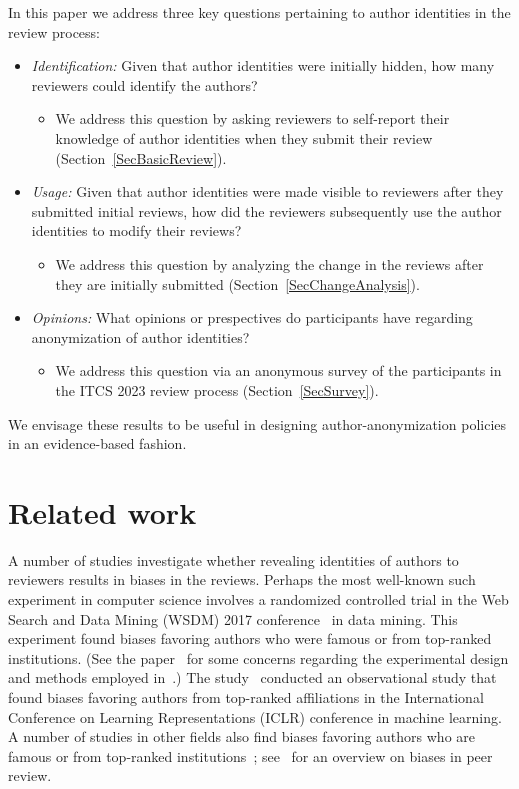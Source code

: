 \documentclass{article}
\newcommand{\rev}[1]{{\color{black}#1}}
\begin{document}
In this paper we address three key questions pertaining to author identities in the review process:
\begin{itemize}
\item \emph{Identification:} Given that author identities were initially hidden, how many reviewers could identify the authors?
\begin{itemize}
    \item We address this question by asking reviewers to self-report their knowledge of author identities when they submit their review (Section~\ref{SecBasicReview}). 
\end{itemize}
%
\item \emph{Usage:} Given that author identities were made visible to reviewers after they submitted initial reviews, how did the reviewers subsequently use the author identities to modify their reviews?
\begin{itemize}
    \item We address this question by analyzing the change in the reviews after they are initially submitted (Section~\ref{SecChangeAnalysis}). 
\end{itemize}
%
\item \emph{Opinions:} What opinions or prespectives do participants have regarding anonymization of author identities? 
\begin{itemize}
    \item We address this question via an anonymous survey of the participants in the ITCS 2023 review process (Section~\ref{SecSurvey}). 
\end{itemize}
\end{itemize}
We envisage these results to be useful in designing author-anonymization policies in an evidence-based fashion.


\section{Related work}

A number of studies investigate whether revealing identities of authors to reviewers results in biases in the reviews. Perhaps the most well-known such experiment in computer science involves a randomized controlled trial in the Web Search and Data Mining (WSDM) 2017 conference~\cite{tomkins2017reviewer} in data mining. This experiment found biases favoring authors who were famous or from top-ranked institutions. (See the paper~\cite{stelmakh2019testing} for some concerns regarding the experimental design and methods employed in~\cite{tomkins2017reviewer}.) The study~\cite{manzoor2020uncovering} conducted an observational study that found biases favoring authors from top-ranked affiliations in the International Conference on Learning Representations (ICLR) conference in machine learning. A number of studies in other fields also find biases favoring authors who are famous or from top-ranked institutions~\cite{okike2016single,blank1991effects,ross2006effect,garfunkel1994effect,fisher1994effects,huber2022nobel}; \rev{see~\cite{haffar2019peer} for an overview on biases in peer review}. 
\end{document}
